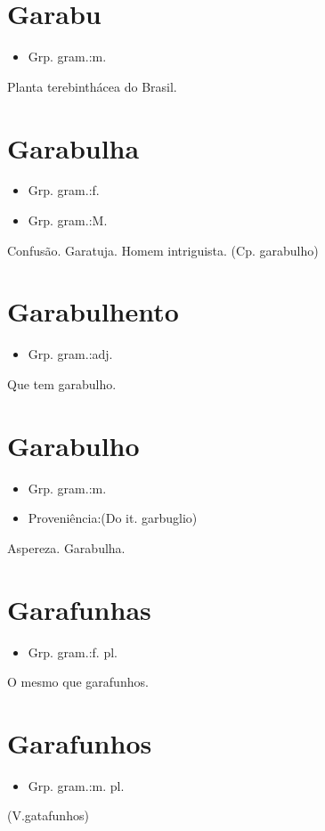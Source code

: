 \section{Garabu}
\begin{itemize}
\item {Grp. gram.:m.}
\end{itemize}
Planta terebinthácea do Brasil.
\section{Garabulha}
\begin{itemize}
\item {Grp. gram.:f.}
\end{itemize}
\begin{itemize}
\item {Grp. gram.:M.}
\end{itemize}
Confusão.
Garatuja.
Homem intriguista.
(Cp. \textunderscore garabulho\textunderscore )
\section{Garabulhento}
\begin{itemize}
\item {Grp. gram.:adj.}
\end{itemize}
Que tem garabulho.
\section{Garabulho}
\begin{itemize}
\item {Grp. gram.:m.}
\end{itemize}
\begin{itemize}
\item {Proveniência:(Do it. \textunderscore garbuglio\textunderscore )}
\end{itemize}
Aspereza.
Garabulha.
\section{Garafunhas}
\begin{itemize}
\item {Grp. gram.:f. pl.}
\end{itemize}
O mesmo que \textunderscore garafunhos\textunderscore .
\section{Garafunhos}
\begin{itemize}
\item {Grp. gram.:m. pl.}
\end{itemize}
(V.gatafunhos)
